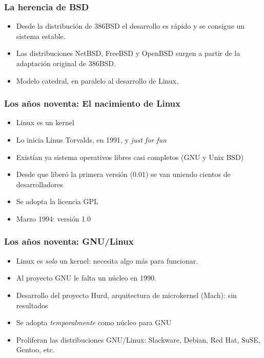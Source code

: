 \documentclass{beamer}
\begin{document}
\begin{frame}
\frametitle{La herencia de BSD}

\begin{itemize}
\item Desde la distribución de 386BSD el desarrollo es rápido y se consigue un sistema estable.
\item Las distribuciones NetBSD, FreeBSD y OpenBSD surgen a partir de la adaptación original de 386BSD.
\item Modelo catedral, en paralelo al desarrollo de Linux.
\end{itemize}

\end{frame}




\begin{frame}
\frametitle{Los años noventa: El nacimiento de Linux}


\begin{itemize}

\item {Linux es un kernel}
\item {Lo inicia Linus Torvalds, en 1991, y \textit{just for fun}}
\item {Existían ya sistema operativos libres casi completos (GNU y Unix BSD)}
\item Desde que liberó la primera versión (0.01) se van uniendo cientos de desarrolladores
\item Se adopta la licencia GPL
\item Marzo 1994: versión 1.0

\end{itemize}

\end{frame}


\begin{frame}
\frametitle{Los años noventa: GNU/Linux}


\begin{itemize}

\item Linux es \textit{solo} un kernel: necesita algo más para funcionar.
\item Al proyecto GNU le falta un núcleo en 1990.
\item Desarrollo del proyecto Hurd, arquitectura de microkernel (Mach): sin resultados
\item Se adopta \textit{temporalmente} como núcleo para GNU
\item Proliferan las distribuciones GNU/Linux: Slackware, Debian, Red Hat, SuSE, Gentoo, etc.

\end{itemize}

\end{frame}
\end{document}

